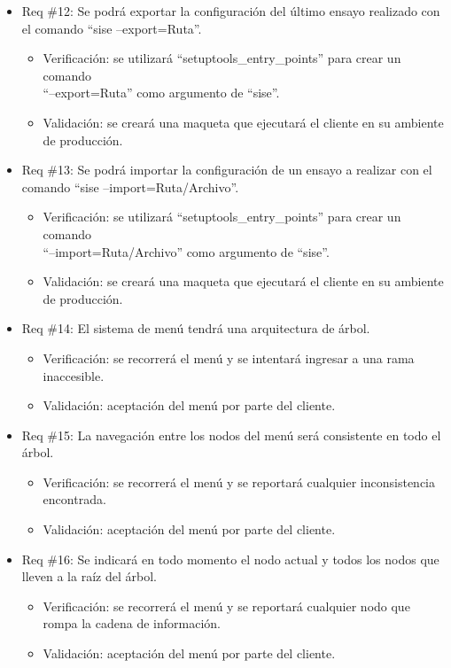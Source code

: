 \documentclass[
11pt, %
]{charter}
\begin{document}
\begin{itemize}
\item Req \#12: Se podrá exportar la configuración del último ensayo realizado con el comando ``sise --export=Ruta''.
\begin{itemize}
    \item Verificación: se utilizará ``setuptools\_entry\_points'' para crear un comando \\``--export=Ruta'' como argumento de ``sise''.
    \item Validación: se creará una maqueta que ejecutará el cliente en su ambiente de producción.
\end{itemize}

\item Req \#13: Se podrá importar la configuración de un ensayo a realizar con el comando ``sise --import=Ruta/Archivo''.
\begin{itemize}
    \item Verificación: se utilizará ``setuptools\_entry\_points'' para crear un comando \\``--import=Ruta/Archivo'' como argumento de ``sise''.
    \item Validación: se creará una maqueta que ejecutará el cliente en su ambiente de producción.
\end{itemize}

\item Req \#14: El sistema de menú tendrá una arquitectura de árbol.
\begin{itemize}
    \item Verificación: se recorrerá el menú y se intentará ingresar a una rama inaccesible.
    \item Validación: aceptación del menú por parte del cliente.
\end{itemize}

\item Req \#15: La navegación entre los nodos del menú será consistente en todo el árbol.
\begin{itemize}
    \item Verificación: se recorrerá el menú y se reportará cualquier inconsistencia encontrada.
    \item Validación: aceptación del menú por parte del cliente.
\end{itemize}

\item Req \#16: Se indicará en todo momento el nodo actual y todos los nodos que lleven a la raíz del árbol.
\begin{itemize}
    \item Verificación: se recorrerá el menú y se reportará cualquier nodo que rompa la cadena de información.
    \item Validación: aceptación del menú por parte del cliente.
\end{itemize}


\end{itemize}
\end{document}
